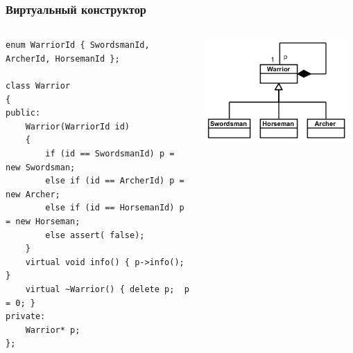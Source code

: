 \documentclass[xetex,mathserif,serif]{beamer}
\begin{document}
	\begin{frame}[fragile]
		\frametitle{Виртуальный конструктор}
		\begin{columns}
			\begin{column}{0.6\textwidth}
				\begin{footnotesize}
					\begin{verbatim}
enum WarriorId { SwordsmanId, ArcherId, HorsemanId };

class Warrior
{
public:  
    Warrior(WarriorId id)
    {
        if (id == SwordsmanId) p = new Swordsman;
        else if (id == ArcherId) p = new Archer;
        else if (id == HorsemanId) p = new Horseman;
        else assert( false);
    }
    virtual void info() { p->info(); }
    virtual ~Warrior() { delete p;  p = 0; }
private:
    Warrior* p;
};
					\end{verbatim}
				\end{footnotesize}
			\end{column}
			\begin{column}{0.4\textwidth}
				\begin{center}
					\includegraphics[width=0.95\textwidth]{warriorVirtualCtor.png}
				\end{center}
			\end{column}
		\end{columns}
	\end{frame}
\end{document}
